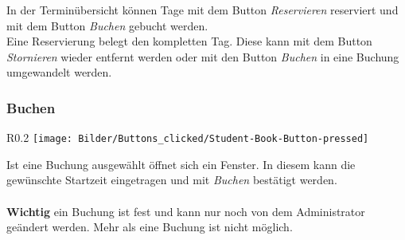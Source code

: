 In der Terminübersicht können Tage mit dem Button \textit{Reservieren} reserviert und mit dem Button \textit{Buchen} gebucht werden. 
\\
Eine Reservierung belegt den kompletten Tag. Diese kann mit dem Button \textit{Stornieren} wieder entfernt werden oder mit den Button \textit{Buchen} in eine Buchung umgewandelt werden.

\subsubsection{Buchen}
\begin{wrapfigure}{R}{0.2\textwidth}
 	\centering
 	\texttt{[image: Bilder/Buttons\_clicked/Student-Book-Button-pressed]}
\end{wrapfigure}
 Ist eine Buchung ausgewählt öffnet sich ein Fenster. In diesem kann die gewünschte Startzeit eingetragen und mit \textit{Buchen} bestätigt werden. 
 \\
 \\
 \textbf{Wichtig} ein Buchung ist fest und kann nur noch von dem Administrator geändert werden. Mehr als eine Buchung ist nicht möglich. 